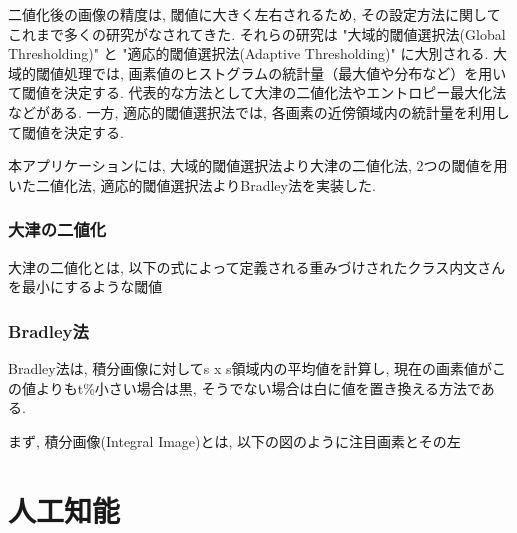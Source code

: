 \documentclass{suribt}
\begin{document}
二値化後の画像の精度は, 閾値に大きく左右されるため, その設定方法に関してこれまで多くの研究がなされてきた\cite{Otsu-1979, Bradley-2007}. それらの研究は "大域的閾値選択法(Global Thresholding)" と "適応的閾値選択法(Adaptive Thresholding)" に大別される. 大域的閾値処理では, 画素値のヒストグラムの統計量（最大値や分布など）を用いて閾値を決定する. 代表的な方法として大津の二値化法やエントロピー最大化法などがある. 一方, 適応的閾値選択法では, 各画素の近傍領域内の統計量を利用して閾値を決定する. 

本アプリケーションには, 大域的閾値選択法より大津の二値化法, 2つの閾値を用いた二値化法, 適応的閾値選択法よりBradley法を実装した. 
\subsection{大津の二値化}
大津の二値化とは, 以下の式によって定義される重みづけされたクラス内文さんを最小にするような閾値

\subsection{Bradley法}
Bradley法は, 積分画像に対してs x s領域内の平均値を計算し, 現在の画素値がこの値よりもt\%小さい場合は黒, そうでない場合は白に値を置き換える方法である.

まず, 積分画像(Integral Image)とは, 以下の図のように注目画素とその左

\chapter{人工知能}

\end{document}

